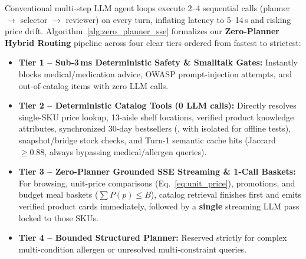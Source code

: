 Conventional multi-step LLM agent loops execute 2--4 sequential calls (planner $\to$ selector $\to$ reviewer) on every turn, inflating latency to 5--14\,s and risking price drift. Algorithm~\ref{alg:zero_planner_sse} formalizes our \textbf{Zero-Planner Hybrid Routing} pipeline across four clear tiers ordered from fastest to strictest:
\begin{itemize}
    \item \textbf{Tier 1 -- Sub-3\,ms Deterministic Safety \& Smalltalk Gates:} Instantly blocks medical/medication advice, OWASP prompt-injection attempts, and out-of-catalog items with zero LLM calls.
    \item \textbf{Tier 2 -- Deterministic Catalog Tools (0 LLM calls):} Directly resolves single-SKU price lookup, 13-aisle shelf locations, verified product knowledge attributes, synchronized 30-day bestsellers (, with  isolated for offline tests), snapshot/bridge stock checks, and Turn-1 semantic cache hits (Jaccard $\ge 0.88$, always bypassing medical/allergen queries).
    \item \textbf{Tier 3 -- Zero-Planner Grounded SSE Streaming \& 1-Call Baskets:} For browsing, unit-price comparisons (Eq.~\ref{eq:unit_price}), promotions, and budget meal baskets ($\sum P(p) \le B$), catalog retrieval finishes first and emits verified product cards immediately, followed by a \textbf{single} streaming LLM pass locked to those SKUs.
    \item \textbf{Tier 4 -- Bounded Structured Planner:} Reserved strictly for complex multi-condition allergen or unresolved multi-constraint queries.
\end{itemize}


